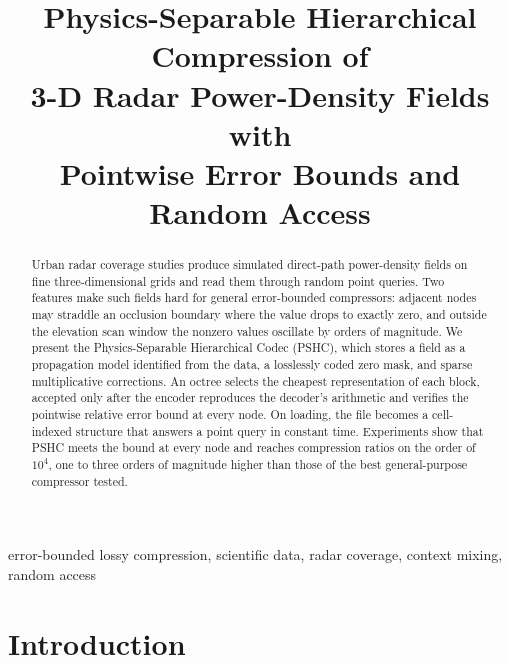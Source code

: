 \documentclass[conference]{IEEEtran}
\begin{document}
\title{Physics-Separable Hierarchical Compression of\\ 3-D Radar Power-Density Fields with\\ Pointwise Error Bounds and Random Access}

\author{
}

\maketitle

\begin{abstract}
Urban radar coverage studies produce simulated direct-path power-density fields on fine three-dimensional grids and read them through random point queries. Two features make such fields hard for general error-bounded compressors: adjacent nodes may straddle an occlusion boundary where the value drops to exactly zero, and outside the elevation scan window the nonzero values oscillate by orders of magnitude. We present the Physics-Separable Hierarchical Codec (PSHC), which stores a field as a propagation model identified from the data, a losslessly coded zero mask, and sparse multiplicative corrections. An octree selects the cheapest representation of each block, accepted only after the encoder reproduces the decoder's arithmetic and verifies the pointwise relative error bound at every node. On loading, the file becomes a cell-indexed structure that answers a point query in constant time. Experiments show that PSHC meets the bound at every node and reaches compression ratios on the order of $10^4$, one to three orders of magnitude higher than those of the best general-purpose compressor tested.
\end{abstract}

\begin{IEEEkeywords}
error-bounded lossy compression, scientific data, radar coverage, context mixing, random access
\end{IEEEkeywords}

\section{Introduction}
\end{document}
